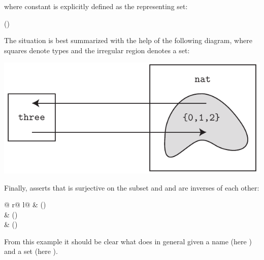 \begin{isabellebody}
\begin{isamarkuptext}
where constant  is explicitly defined as the representing set:
\begin{center}
\hfill()
\end{center}
The situation is best summarized with the help of the following diagram,
where squares denote types and the irregular region denotes a set:
\begin{center}
\includegraphics[scale=.8]{typedef}
\end{center}
Finally,  asserts that  is
surjective on the subset  and  and  are inverses of each other:
\begin{center}
\begin{tabular}{@ {}r@ {\qquad\qquad}l@ {}}
 & () \\
 & () \\
 & ()
\end{tabular}
\end{center}
%
From this example it should be clear what  does
in general given a name (here ) and a set
(here ).


\end{isamarkuptext}
\end{isabellebody}
